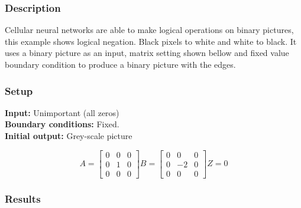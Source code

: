 \subsubsection{Description}
Cellular neural networks are able to make logical operations on binary pictures, this example shows logical negation. Black pixels to white and white to black. It uses a binary picture as an input, matrix setting shown bellow and fixed value boundary condition to produce a binary picture with the edges.
\subsubsection{Setup}

\textbf{Input:} Unimportant (all zeros)\\
\textbf{Boundary conditions:} Fixed.\\
\textbf{Initial output:} Grey-scale picture

\begin{minipage}{0.9\linewidth}
\begin{equation}
A =
\begin{bmatrix}
 0 &  0 &  0 \\
  0 &  1 &  0 \\
  0 &  0 &  0
\end{bmatrix}
B =
\begin{bmatrix}
 0 & 0 & 0 \\
 0 & -2 & 0 \\
 0 & 0 & 0
\end{bmatrix}
Z = 0
\end{equation}
\end{minipage}

\subsubsection{Results}


